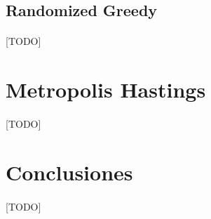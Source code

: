 \documentclass{subfiles}
\begin{document}
      \subsection{Randomized Greedy}
      \label{sec:heuristics_randomized_greedy}

        \paragraph{}
        [TODO]

    \section{Metropolis Hastings}
    \label{sec:heuristics_metropolis}

      \paragraph{}
      [TODO]

    \section{Conclusiones}
    \label{sec:heuristics_conclusions}

      \paragraph{}
      [TODO]
\end{document}
